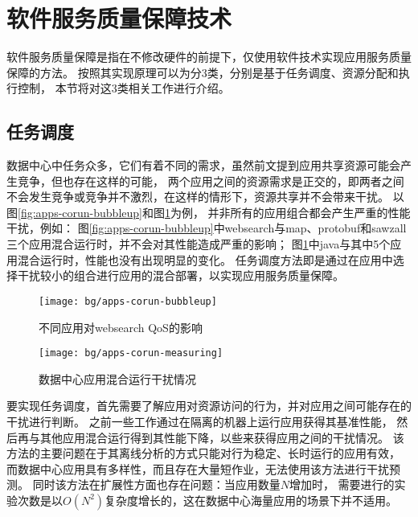 \section{软件服务质量保障技术}

软件服务质量保障是指在不修改硬件的前提下，仅使用软件技术实现应用服务质量保障的方法。
按照其实现原理可以为分3类，分别是基于任务调度、资源分配和执行控制，
本节将对这3类相关工作进行介绍。

\subsection{任务调度}

数据中心中任务众多，它们有着不同的需求，虽然前文提到应用共享资源可能会产生竞争，但也存在这样的可能，
两个应用之间的资源需求是正交的，即两者之间不会发生竞争或竞争并不激烈，在这样的情形下，资源共享并不会带来干扰。
以图\ref{fig:apps-corun-bubbleup}和图\ref{fig:apps-corun-measuring}为例，
并非所有的应用组合都会产生严重的性能干扰，例如：
图\ref{fig:apps-corun-bubbleup}中websearch与map、protobuf和sawzall三个应用混合运行时，并不会对其性能造成严重的影响；
图\ref{fig:apps-corun-measuring}中java与其中5个应用混合运行时，性能也没有出现明显的变化。
任务调度方法即是通过在应用中选择干扰较小的组合进行应用的混合部署，以实现应用服务质量保障。

\begin{figure}[tb]
\begin{minipage}[b]{0.48\textwidth}
  \centering
  \texttt{[image: bg/apps-corun-bubbleup]}
  \caption{不同应用对websearch QoS的影响\cite{mars_bubble-up:_2011}}
  \label{fig:apps-corun-bubbleup}
\end{minipage}\hfill
\begin{minipage}[b]{0.48\textwidth}
  \centering
  \texttt{[image: bg/apps-corun-measuring]}
  \caption{数据中心应用混合运行干扰情况\cite{kambadur_measuring_2012}}
  \label{fig:apps-corun-measuring}
\end{minipage}
\end{figure}

要实现任务调度，首先需要了解应用对资源访问的行为，并对应用之间可能存在的干扰进行判断。
之前一些工作\cite{}通过在隔离的机器上运行应用获得其基准性能，
然后再与其他应用混合运行得到其性能下降，以些来获得应用之间的干扰情况。
该方法的主要问题在于其离线分析的方式只能对行为稳定、长时运行的应用有效，
而数据中心应用具有多样性，而且存在大量短作业，无法使用该方法进行干扰预测。
同时该方法在扩展性方面也存在问题：当应用数量$N$增加时，
需要进行的实验次数是以$O(N^2)$复杂度增长的，这在数据中心海量应用的场景下并不适用。

